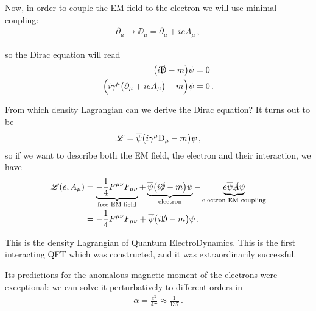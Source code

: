 \documentclass[main.tex]{subfiles}
\begin{document}
Now, in order to couple the EM field to the electron we will use minimal coupling: 
%
\begin{align}
\partial_{\mu } \rightarrow \DD_{\mu } = \partial_{\mu } + ie A_{\mu }
\,,
\end{align}
%

so the Dirac equation will read 
%
\begin{subequations}
\begin{align}
\qty( i \slashed{\mathrm{D}} -m ) \psi &= 0  \\
\qty(i \gamma^{\mu } \qty(\partial_{\mu } + ie A_{\mu }) -m ) \psi &= 0 
\,.
\end{align}
\end{subequations}

From which density Lagrangian can we derive the Dirac equation? It turns out to be 
%
\begin{align}
\mathscr{L} = \overline{\psi} \qty(i \gamma^{\mu } \mathrm{D}_{\mu } -m ) \psi 
\,,
\end{align}
%
so if we want to describe both the EM field, the electron and their interaction, we have 
%
\begin{align}
\mathscr{L} (e, A_{\mu }) &= 
\underbrace{- \frac{1}{4} F^{\mu \nu } F_{\mu \nu }}_{\text{free EM field}} + \underbrace{\overline{\psi} \qty(i \slashed{\partial} - m) \psi}_{\text{electron}} 
- \underbrace{e\overline{\psi} \slashed{A} \psi}_{\text{electron-EM coupling}}  \\
&= - \frac{1}{4} F^{\mu \nu }F_{\mu \nu } + \overline{\psi} \qty(i \slashed{\mathrm{D}} - m )\psi 
\,.
\end{align}

This is the density Lagrangian of Quantum ElectroDynamics. 
This is the first interacting QFT which was constructed, and it was extraordinarily successful. 

Its predictions for the anomalous magnetic moment of the electrons were exceptional: we can solve it perturbatively to different orders in 
%
\begin{align}
\alpha = \frac{e^2}{4 \pi } \approx \frac{1}{137}
\,.
\end{align}
\end{document}
